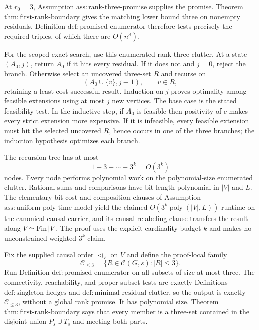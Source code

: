 At \(r_0=3\), Assumption
\(\mathrm{ass{:}rank\mbox{-}three\mbox{-}promise}\) supplies the promise.
Theorem \(\mathrm{thm{:}first\mbox{-}rank\mbox{-}boundary}\) gives the
matching lower bound three on nonempty residuals.  Definition
\(\mathrm{def{:}promised\mbox{-}enumerator}\) therefore tests precisely
the required triples, of which there are \(O(n^3)\).

For the scoped exact search, use this enumerated rank-three clutter.  At a
state \((A_0,j)\), return \(A_0\) if it hits every residual.  If it does
not and \(j=0\), reject the branch.  Otherwise select an uncovered
three-set \(R\) and recurse on
\[
 (A_0\cup\{v\},j-1),
 \qquad v\in R,
\]
retaining a least-cost successful result.  Induction on \(j\) proves
optimality among feasible extensions using at most \(j\) new vertices.
The base case is the stated feasibility test.  In the inductive step, if
\(A_0\) is feasible then positivity of \(c\) makes every strict extension
more expensive.  If it is infeasible, every feasible extension must hit
the selected uncovered \(R\), hence occurs in one of the three branches;
the induction hypothesis optimizes each branch.

The recursion tree has at most
\[
 1+3+\cdots+3^k=O(3^k)
\]
nodes.  Every node performs polynomial work on the polynomial-size
enumerated clutter.  Rational sums and comparisons have bit length
polynomial in \(|V|\) and \(L\).  The elementary bit-cost and composition
clauses of Assumption
\(\mathrm{ass{:}uniform\mbox{-}poly\mbox{-}time\mbox{-}model}\) yield the
claimed \(O(3^k\operatorname{poly}(|V|,L))\) runtime on the canonical
causal carrier, and its causal relabeling clause transfers the result along
\(V\simeq\mathrm{Fin}\,|V|\).  The proof uses the explicit cardinality
budget \(k\) and makes no unconstrained weighted \(3^k\) claim.

Fix the supplied causal order \(\triangleleft_V\) on \(V\) and define the
proof-local family
\[
 \mathcal C_{\leq3}=\{R\in\mathcal C(G,s):|R|\leq3\}.
\]
Run Definition \(\mathrm{def{:}promised\mbox{-}enumerator}\) on all
subsets of size at most three.  The connectivity, reachability, and
proper-subset tests are exactly Definitions
\(\mathrm{def{:}singleton\mbox{-}hedges}\) and
\(\mathrm{def{:}minimal\mbox{-}residual\mbox{-}clutter}\), so the output
is exactly \(\mathcal C_{\leq3}\), without a global rank promise.  It has
polynomial size.  Theorem
\(\mathrm{thm{:}first\mbox{-}rank\mbox{-}boundary}\) says that every
member is a three-set contained in the disjoint union
\(P_s\mathbin{\dot\cup}T_s\) and meeting both parts.

